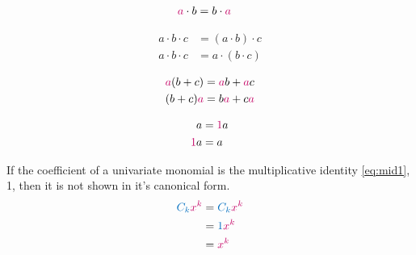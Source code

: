 \documentclass[20150903-160354-rs2.2-MarksMathNotebook.tex]{subfiles}
\begin{document}
\begin{property}
\begin{align}
\alert{a} \cdot b &= b \cdot \alert{a} \label{eq:cpm}
\end{align}
\end{property}

\begin{property}
\begin{subequations}
\begin{align}
a\cdot b\cdot c &= (a\cdot b)\cdot c \label{eq:apm1} \\
a\cdot b\cdot c &= a\cdot (b\cdot c) \label{eq:apm2}
\end{align}
\end{subequations}
\end{property}

\begin{property}
\begin{subequations}
\begin{align}
\alert{a}(b+c) &= \alert{a}b + \alert{a}c \label{eq:dpe1} \\
 (b+c)\alert{a} &= b\alert{a} + c\alert{a}  \label{eq:dpe2}
\end{align}
\end{subequations}
\end{property}

\begin{property}
\begin{subequations}
\begin{align}
a &= \alert{1}a \label{eq:mid1} \\
\alert{1}a &= a \label{eq:mid2}
\end{align}
\end{subequations}
\end{property}

\begin{remark}
If the coefficient of a univariate monomial is the multiplicative identity \ref{eq:mid1}, 1, then it is not shown in it's canonical form.
\begin{align*}
 \cBlue{C_{k}}\cRed{x^{k}}	& = \cBlue{C_{k}} \cRed{x^{k}} \\
 							& = \cBlue{1} \cRed{x^{k}} \\
                            & = \cRed{x^{k}}
\end{align*}
\end{remark}
\end{document}
